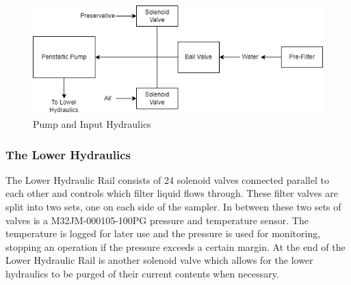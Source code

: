 \documentclass[11pt, letterpaper]{article}
\begin{document}
\begin{figure}[H]
	\centering
	\includegraphics[scale=0.75]{./Assets/PolyWAG_HX_HD_InHydr.png}
	\caption{Pump and Input Hydraulics}
\end{figure}

\subsubsection{The Lower Hydraulics}
The Lower Hydraulic Rail consists of 24 solenoid valves connected parallel to each other and controls which filter liquid flows through. These filter valves are split into two sets, one on each side of the sampler. In between these two sets of valves is a M32JM-000105-100PG pressure and temperature sensor. The temperature is logged for later use and the pressure is used for monitoring, stopping an operation if the pressure exceeds a certain margin. At the end of the Lower Hydraulic Rail is another solenoid valve which allows for the lower hydraulics to be purged of their current contents when necessary.
\end{document}
